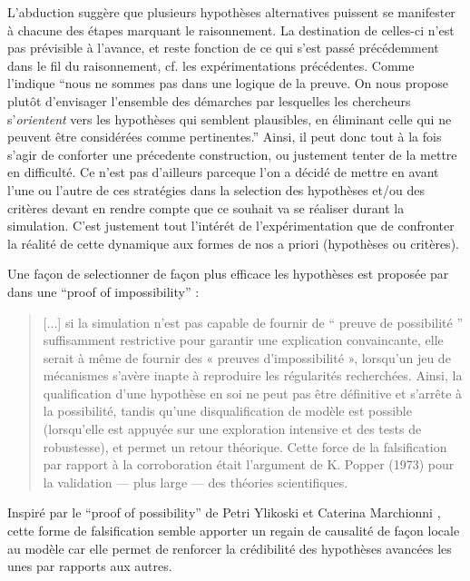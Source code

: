 


L'abduction suggère que plusieurs hypothèses alternatives puissent se manifester à chacune des étapes marquant le raisonnement. La destination de celles-ci n'est pas prévisible à l'avance, et reste fonction de ce qui s'est passé précédemment dans le fil du raisonnement, cf. les expérimentations précédentes. Comme l'indique \textcite{Besse2000} \enquote{nous ne sommes pas dans une logique de la preuve. On nous propose plutôt d'envisager l'ensemble des démarches par lesquelles les chercheurs s'\textit{orientent} vers les hypothèses qui semblent plausibles, en éliminant celle qui ne peuvent être considérées comme pertinentes.} Ainsi, il peut donc tout à la fois s'agir de conforter une précedente construction, ou justement tenter de la mettre en difficulté. Ce n'est pas d'ailleurs parceque l'on a décidé de mettre en avant l'une ou l'autre de ces stratégies dans la selection des hypothèses et/ou des critères devant en rendre compte que ce souhait va se réaliser durant la simulation. C'est justement tout l'intérét de l'expérimentation que de confronter la réalité de cette dynamique aux formes de nos a priori (hypothèses ou critères).

Une façon de selectionner de façon plus efficace les hypothèses est proposée par \textcite[300]{Cottineau2014b} dans une \foreignquote{english}{proof of impossibility} : 

\blockquote[{\cite[300]{Cottineau2014b}}]{[...] si la simulation n’est pas capable de fournir de \enquote{ preuve de possibilité } suffisamment restrictive pour garantir une explication convaincante, elle serait à même de fournir des « preuves d’impossibilité », lorsqu’un jeu de mécanismes s’avère inapte à reproduire les régularités recherchées. Ainsi, la qualification d’une hypothèse en soi ne peut pas être définitive et s’arrête à la possibilité, tandis qu’une disqualification de modèle est possible (lorsqu’elle est appuyée sur une exploration intensive et des tests de robustesse), et permet un retour théorique. Cette force de la falsification par rapport à la corroboration était l’argument de K. Popper (1973) pour la validation — plus large — des théories scientifiques.}

Inspiré par le \foreignquote{english}{proof of possibility} de Petri Ylikoski et Caterina Marchionni \autocite{Marchionni2013}, cette forme de falsification  semble apporter un regain de causalité de façon locale au modèle car elle permet de renforcer la crédibilité des hypothèses avancées les unes par rapports aux autres.


